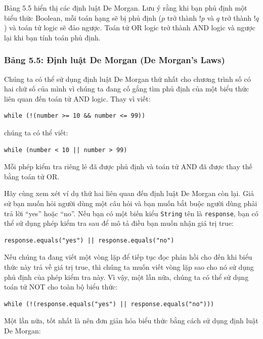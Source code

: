 Bảng 5.5 hiển thị các định luật De Morgan. Lưu ý rằng khi bạn phủ định một biểu thức Boolean, mỗi toán hạng sẽ bị phủ định ($p$ trở thành $!p$ và $q$ trở thành $!q$) và toán tử logic sẽ đảo ngược. Toán tử OR logic trở thành AND logic và ngược lại khi bạn tính toán phủ định.

\subsubsection*{Bảng 5.5: Định luật De Morgan (De Morgan's Laws)}

Chúng ta có thể sử dụng định luật De Morgan thứ nhất cho chương trình số có hai chữ số của mình vì chúng ta đang cố gắng tìm phủ định của một biểu thức liên quan đến toán tử AND logic. Thay vì viết:

\begin{verbatim}
while (!(number >= 10 && number <= 99))
\end{verbatim}

chúng ta có thể viết:

\begin{verbatim}
while (number < 10 || number > 99)
\end{verbatim}

Mỗi phép kiểm tra riêng lẻ đã được phủ định và toán tử AND đã được thay thế bằng toán tử OR.

Hãy cùng xem xét ví dụ thứ hai liên quan đến định luật De Morgan còn lại. Giả sử bạn muốn hỏi người dùng một câu hỏi và bạn muốn bắt buộc người dùng phải trả lời ``yes'' hoặc ``no''. Nếu bạn có một biến kiểu \texttt{String} tên là \texttt{response}, bạn có thể sử dụng phép kiểm tra sau để mô tả điều bạn muốn nhận giá trị true:

\begin{verbatim}
response.equals("yes") || response.equals("no")
\end{verbatim}

Nếu chúng ta đang viết một vòng lặp để tiếp tục đọc phản hồi cho đến khi biểu thức này trả về giá trị true, thì chúng ta muốn viết vòng lặp sao cho nó sử dụng phủ định của phép kiểm tra này. Vì vậy, một lần nữa, chúng ta có thể sử dụng toán tử NOT cho toàn bộ biểu thức:

\begin{verbatim}
while (!(response.equals("yes") || response.equals("no")))
\end{verbatim}

Một lần nữa, tốt nhất là nên đơn giản hóa biểu thức bằng cách sử dụng định luật De Morgan:

